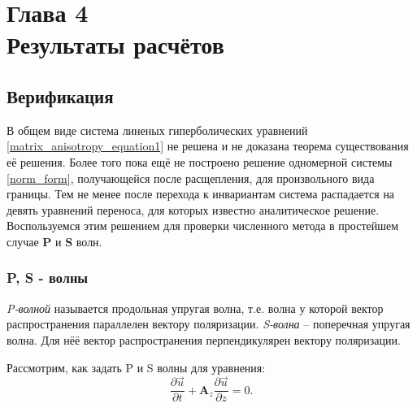 \section*{Глава 4\\Результаты расчётов}
\setcounter{section}{4}
\setcounter{subsection}{0}
\setcounter{equation}{0}

\subsection{Верификация}

	В общем виде система линеных гиперболических уравнений \eqref{matrix_anisotropy_equation1} не решена и не доказана теорема существования её решения.
	Более того пока ещё не построено решение одномерной системы \eqref{norm_form}, получающейся после расщепления, для произвольного вида границы.
	Тем не менее после перехода к инвариантам система распадается на девять уравнений переноса, для которых известно аналитическое решение.
	Воспользуемся этим решением для проверки численного метода в простейшем случае \textbf{P} и \textbf{S} волн.

\subsubsection{P, S - волны}

	\textit{P-волной} называется продольная упругая волна, т.е. волна у которой вектор распространения параллелен вектору поляризации.
	\textit{S-волна} -- поперечная упругая волна. Для нёё вектор распространения перпендикулярен вектору поляризации.
	
	Рассмотрим, как задать P и S волны для уравнения:
\begin{equation}
	\label{norm_form_results}
	\frac{\partial\vec{u}}{\partial{t}}+\mathbf{A}_z\frac{\partial\vec{u}}{\partial{z}}=0.
\end{equation}
	
